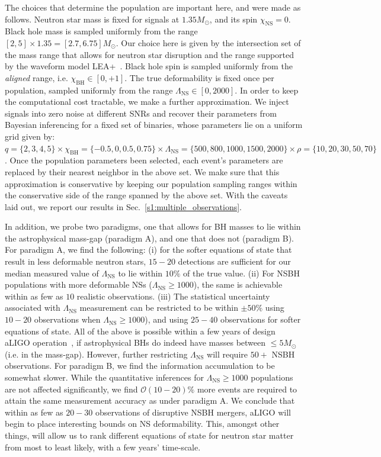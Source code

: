 \documentclass[aps,prd,amsmath,floats,floatfix, twocolumn,
superscriptaddress,nofootinbib,showpacs]{revtex4-1}
\newcommand{\prayush}{\textcolor{red!40!black}}
\newcommand{\lambdans}{\Lambda_\mathrm{NS}}
\newcommand{\chibh}{\chi_\mathrm{BH}}
\newcommand{\chins}{\chi_\mathrm{NS}}
\begin{document}
\prayush{
The choices that determine the population are important here,
and were made as follows. Neutron star mass is fixed for signals at
$1.35M_\odot$, and its spin $\chins=0$. Black hole mass is sampled uniformly
from the range $[2,5]\times 1.35=[2.7, 6.75]M_\odot$. Our choice here is given
by the intersection set of the mass range that allows for neutron star disruption
and the range supported by the waveform model LEA+~\cite{Foucart2012,
Foucart:2013a,Lackey:2013axa}. Black hole spin is sampled uniformly from the
{\it aligned} range, i.e. $\chibh\in[0,+1]$. The true deformability is fixed
once per population, sampled uniformly from the range $\lambdans\in[0,2000]$.
In order to keep the computational cost tractable, we make a further 
approximation.
%
We inject signals into zero noise at different SNRs and recover
their parameters from Bayesian inferencing for a fixed set of binaries,
whose parameters lie on a uniform grid given by:
$q=\{2,3,4,5\}\times\chibh=\{-0.5,0,0.5,0.75\}\times\lambdans=\{500,800,1000,1500,2000\}\times\rho=\{10,20,30,50,70\}$.
% 
Once the population parameters been selected, each event's parameters are
replaced by their nearest neighbor in the above set.
% 
We make sure that this approximation is conservative by keeping our population
sampling ranges within the conservative side of the range spanned by the above
set. With the caveats laid out, we report our results in
Sec.~\ref{s1:multiple_observations}.
}


\prayush{
In addition, we probe two paradigms, one
that allows for BH masses to lie within the astrophysical mass-gap (paradigm
A), and one that does not (paradigm B).
% 
For paradigm A, we find the following: (i) for the softer equations of state
that result in less deformable neutron stars, $15-20$ detections are sufficient
for our median measured value of $\lambdans$ to lie within $10\%$ of the true
value. (ii) For NSBH populations with more deformable NSs
($\lambdans\geq 1000$), the same is achievable within as few as $10$ realistic
observations. (iii) The statistical uncertainty associated with $\lambdans$
measurement can be restricted to be within $\pm50\%$ using $10-20$ observations
when $\lambdans\geq 1000$), and using $25-40$ observations for softer equations
of state. All of the above is possible within a few years of design
aLIGO operation~\cite{Abadie:2010cfa}, if astrophysical BHs do indeed have
masses between $\leq 5M_\odot$ (i.e. in the mass-gap). However, further
restricting $\lambdans$ will require $50+$ NSBH observations.
% 
For paradigm B, we find the information accumulation to be somewhat slower.
While the quantitative inferences for $\lambdans\geq1000$ populations are
not affected significantly, we find $\mathcal{O}(10-20)\%$ more events are
required to attain the same measurement accuracy as under paradigm A.
% 
We conclude that within as few as $20-30$ observations of disruptive NSBH
mergers, aLIGO will begin to place interesting bounds on NS deformability.
This, amongst other things, will allow us to rank different equations of 
state for neutron star matter from most to least likely, with a few years'
time-scale.
}
\end{document}
